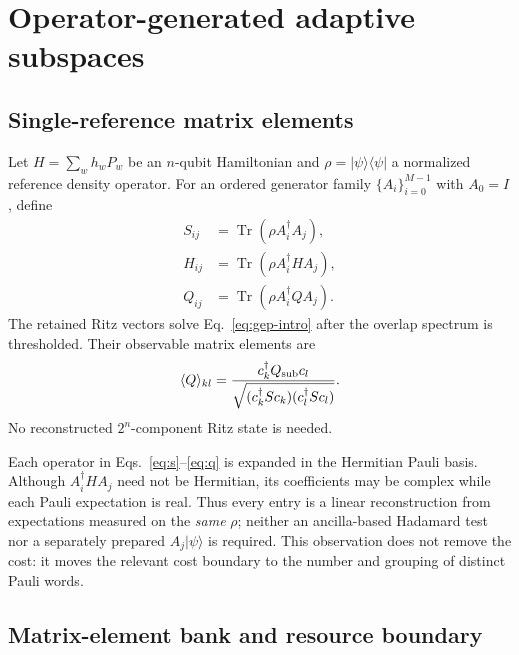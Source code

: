 \documentclass[aps,pra,reprint,superscriptaddress,nofootinbib,floatfix]{revtex4-2}
\newcommand{\Tr}{\operatorname{Tr}}
\newcommand{\ket}[1]{\lvert #1\rangle}
\newcommand{\bra}[1]{\langle #1\rvert}
\newcommand{\avg}[1]{\langle #1\rangle}
\begin{document}
\section{Operator-generated adaptive subspaces}
\label{sec:method}

\subsection{Single-reference matrix elements}
\label{sec:elements}

Let $H=\sum_w h_w P_w$ be an $n$-qubit Hamiltonian and
$\rho=\ket{\psi}\!\bra{\psi}$ a normalized reference density operator.
For an ordered generator family $\{A_i\}_{i=0}^{M-1}$ with $A_0=I$, define
\begin{align}
    S_{ij} &= \Tr(\rho A_i^\dagger A_j), \label{eq:s}\\
    H_{ij} &= \Tr(\rho A_i^\dagger H A_j), \label{eq:h}\\
    Q_{ij} &= \Tr(\rho A_i^\dagger Q A_j). \label{eq:q}
\end{align}
The retained Ritz vectors solve Eq.~\eqref{eq:gep-intro} after the overlap
spectrum is thresholded.  Their observable matrix elements are
\begin{equation}
    \avg{Q}_{kl}
    =\frac{c_k^\dagger Q_{\rm sub}c_l}
    {\sqrt{(c_k^\dagger S c_k)(c_l^\dagger S c_l)}}.
    \label{eq:projected-q}
\end{equation}
No reconstructed $2^n$-component Ritz state is needed.

Each operator in Eqs.~\eqref{eq:s}--\eqref{eq:q} is expanded in the Hermitian
Pauli basis.  Although $A_i^\dagger H A_j$ need not be Hermitian, its
coefficients may be complex while each Pauli expectation is real.  Thus every
entry is a linear reconstruction from expectations measured on the
\emph{same} $\rho$; neither an ancilla-based Hadamard test nor a separately
prepared $A_j\ket{\psi}$ is required.  This observation does not remove the
cost: it moves the relevant cost boundary to the number and grouping of
distinct Pauli words.

\subsection{Matrix-element bank and resource boundary}
\label{sec:bank}
\end{document}
